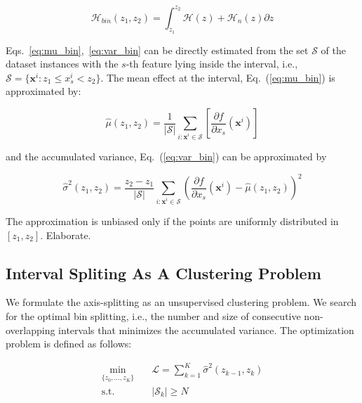 \documentclass[twoside]{article}
\newcommand{\dfdx}{\frac{\partial f}{\partial x_s}}
\begin{document}
\begin{equation}
  \label{eq:uncertainty_bin}
  \mathcal{H}_{bin}(z_1, z_2) = \int_{z_1}^{z_2} \mathcal{H}(z) + \mathcal{H}_n(z) \partial z
\end{equation}


Eqs.~\eqref{eq:mu_bin},~\eqref{eq:var_bin} can be directly estimated
from the set \(\mathcal{S}\) of the dataset instances with the
\(s\)-th feature lying inside the interval, i.e.,
\( \mathcal{S}= \{ \mathbf{x}^i : z_1 \leq x^i_s < z_2 \} \). The mean
effect at the interval, Eq.~(\ref{eq:mu_bin}) is approximated by:

\begin{equation}
  \label{eq:mean_estimation}
  \hat{\mu}(z_1, z_2) = \frac{1}{|\mathcal{S}|} \sum_{i:\mathbf{x}^i \in
    \mathcal{S}} \left [ \dfdx(\mathbf{x}^i) \right ]
\end{equation}

and the accumulated variance, Eq.~(\ref{eq:var_bin}) can be
approximated by

\begin{equation}
  \label{eq:variance_estimation}
  \hat{\sigma}^2(z_1, z_2) = \frac{z_2 - z_1}{|\mathcal{S}|} \sum_{i:\mathbf{x}^i \in
    \mathcal{S}} \left ( \dfdx(\mathbf{x}^i) - \hat{\mu}(z_1, z_2) \right )^2
\end{equation}


The approximation is unbiased only if the points are uniformly
distributed in \([z_1, z_2]\). Elaborate.

\subsection{Interval Spliting As A Clustering Problem}
\label{sec:interval-spliting}

We formulate the axis-splitting as an unsupervised clustering
problem. We search for the optimal bin splitting, i.e., the number and
size of consecutive non-overlapping intervals that minimizes the
accumulated variance. The optimization problem is defined as follows:

\begin{equation}
  \label{eq:opt}
\begin{aligned}
\min_{ \{z_0, \ldots, z_K\}} \quad & \mathcal{L} = \sum_{k=1}^K \hat{\sigma}^2(z_{k-1}, z_k) \\
\textrm{s.t.} \quad & |\mathcal{S}_k| \geq N\\
\end{aligned}
\end{equation}
\end{document}
